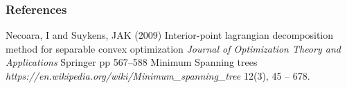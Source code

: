 \documentclass{beamer}
\begin{document}
\begin{frame}
\frametitle{References}
\footnotesize{
\begin{thebibliography}{99} %
 Necoara, I and Suykens, JAK (2009)
\newblock Interior-point lagrangian decomposition method for separable convex optimization
\newblock \emph{Journal of Optimization Theory and Applications} Springer pp 567--588 
 Minimum Spanning trees
\newblock \emph{https://en.wikipedia.org/wiki/Minimum\_spanning\_tree} 12(3), 45 -- 678.
\end{thebibliography}
}
\end{frame}

%


\end{document}
